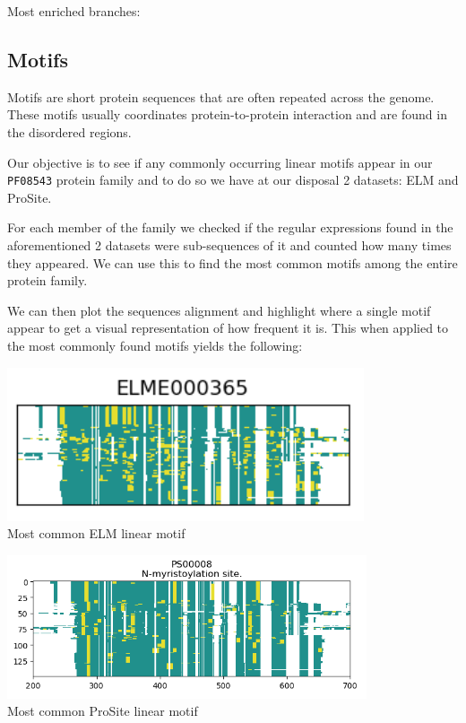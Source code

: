 \documentclass[10pt,twocolumn,letterpaper]{article}
\begin{document}
Most enriched branches:\\



\subsection{Motifs}

Motifs are short protein sequences that are often repeated across the genome. These motifs usually coordinates protein-to-protein interaction and are found in the disordered regions. 

Our objective is to see if any commonly occurring linear motifs appear in our \texttt{PF08543} protein family and to do so we have at our disposal 2 datasets: ELM and ProSite.

For each member of the family we checked if the regular expressions found in the aforementioned 2 datasets were sub-sequences of it and counted how many times they appeared. We can use this to find the most common motifs among the entire protein family.

We can then plot the sequences alignment and highlight where a single motif appear to get a visual representation of how frequent it is. This when applied to the most commonly found motifs yields the following:

\begin{center}
    \includegraphics[scale=1]{report/img/Elm.png} \\
    \small{Most common ELM linear motif}
\end{center}

\begin{center}
    \includegraphics[scale=1]{report/img/prosite.png} \\
    \small{Most common ProSite linear motif}
\end{center}
\end{document}

